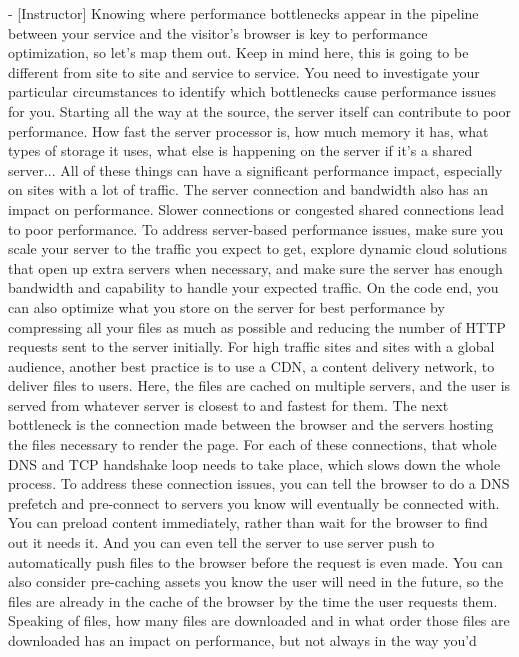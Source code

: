- [Instructor] Knowing where performance bottlenecks appear in the pipeline between
your service and the visitor's browser is key to performance optimization, so let's
map them out. Keep in mind here, this is going to be different from site to site 
and service to service. You need to investigate your particular circumstances to 
identify which bottlenecks cause performance issues for you. Starting all the way 
at the source, the server itself can contribute to poor performance. How fast the 
server processor is, how much memory it has, what types of storage it uses, what 
else is happening on the server if it's a shared server... All of these things can
have a significant performance impact, especially on sites with a lot of traffic.
The server connection and bandwidth also has an impact on performance. Slower
connections or congested shared connections lead to poor performance. To
address server-based performance issues, make sure you scale your server to
the traffic you expect to get, explore dynamic cloud solutions that open up
extra servers when necessary, and make sure the server has enough bandwidth 
and capability to handle your expected traffic. On the code end, you can 
also optimize what you store on the server for best performance by 
compressing all your files as much as possible and reducing the number of
HTTP requests sent to the server initially. For high traffic sites and 
sites with a global audience, another best practice is to use a CDN, a 
content delivery network, to deliver files to users. Here, the files are 
cached on multiple servers, and the user is served from whatever server is
closest to and fastest for them. The next bottleneck is the connection 
made between the browser and the servers hosting the files necessary to 
render the page. For each of these connections, that whole DNS and TCP 
handshake loop needs to take place, which slows down the whole process. To
address these connection issues, you can tell the browser to do a DNS 
prefetch and pre-connect to servers you know will eventually be connected 
with. You can preload content immediately, rather than wait for the 
browser to find out it needs it. And you can even tell the server to use
server push to automatically push files to the browser before the 
request is even made. You can also consider pre-caching assets you know 
the user will need in the future, so the files are already in the cache 
of the browser by the time the user requests them. Speaking of files, 
how many files are downloaded and in what order those files are 
downloaded has an impact on performance, but not always in the way you'd 
